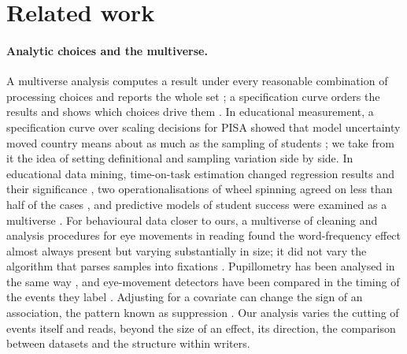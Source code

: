 \section{Related work}
\label{sec:related}

\paragraph{Analytic choices and the multiverse.} A multiverse analysis computes a result under every reasonable
combination of processing choices and reports the whole set \cite{steegen2016multiverse}; a specification curve orders
the results and shows which choices drive them \cite{simonsohn2020specification}. In educational measurement, a
specification curve over scaling decisions for PISA showed that model uncertainty moved country means about as much as
the sampling of students \cite{robitzsch2022multiverse}; we take from it the idea of setting definitional and sampling
variation side by side. In educational data mining, time-on-task estimation changed regression results and their
significance \cite{kovanovic2015time}, two operationalisations of wheel spinning agreed on less than half of the cases
\cite{zhang2019wheel}, and predictive models of student success were examined as a multiverse
\cite{tang2025multiverse}. For behavioural data closer to ours, a multiverse of cleaning and analysis procedures for
eye movements in reading found the word-frequency effect almost always present but varying substantially in size; it
did not vary the algorithm that parses samples into fixations \cite{godwin2025multiverse}. Pupillometry has been
analysed in the same way \cite{calignano2023pupillometry}, and eye-movement detectors have been compared in the timing
of the events they label \cite{nir2026systematic}. Adjusting for a covariate can change the sign of an association, the
pattern known as suppression \cite{mackinnon2000equivalence}. Our analysis varies the cutting of events itself and
reads, beyond the size of an effect, its direction, the comparison between datasets and the structure within writers.

